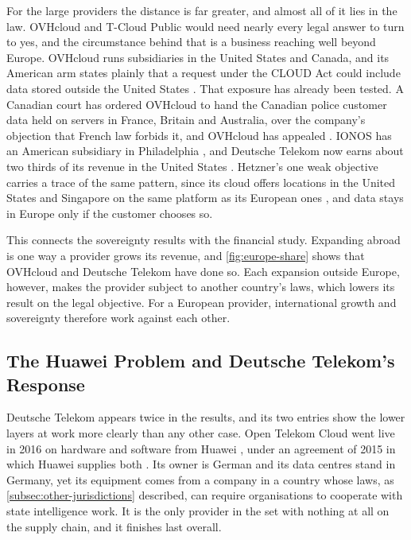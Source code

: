 For the large providers the distance is far greater, and almost all of it lies in
the law. OVHcloud and T-Cloud Public would need nearly every legal answer to turn
to yes, and the circumstance behind that is a business reaching well beyond
Europe. OVHcloud runs subsidiaries in the United States and Canada, and its
American arm states plainly that a request under the \acs{CLOUD Act} could include
data stored outside the United States \cite{OVHUS_CloudAct}. That exposure has
already been tested. A Canadian court has ordered OVHcloud to hand the Canadian
police customer data held on servers in France, Britain and Australia, over the
company's objection that French law forbids it, and OVHcloud has appealed
\cite{Heise_OVHCanada_2025}. IONOS has an American subsidiary in Philadelphia
\cite{UnitedInternet_AR_2025}, and Deutsche Telekom now earns about two thirds of
its revenue in the United States \cite{DT_AR_2025}. Hetzner's one weak objective
carries a trace of the same pattern, since its cloud offers locations in the
United States and Singapore on the same platform as its European ones
\cite{Hetzner_Locations}, and data stays in Europe only if the customer chooses
so.

This connects the sovereignty results with the financial study. Expanding abroad
is one way a provider grows its revenue, and \cref{fig:europe-share} shows that
OVHcloud and Deutsche Telekom have done so. Each expansion outside Europe,
however, makes the provider subject to another country's laws, which lowers its
result on the legal objective. For a European provider, international growth and
sovereignty therefore work against each other.

\subsection{The Huawei Problem and Deutsche Telekom's Response}
\label{subsec:huawei}

Deutsche Telekom appears twice in the results, and its two entries show the lower
layers at work more clearly than any other case. Open Telekom Cloud went live in
2016 on hardware and software from Huawei \cite{OTC_GoesLive_2016}, under an
agreement of 2015 in which Huawei supplies both \cite{LightReading_DT_2025}. Its
owner is German and its data centres stand in Germany, yet its equipment comes
from a company in a country whose laws, as \cref{subsec:other-jurisdictions}
described, can require organisations to cooperate with state intelligence work.
It is the only provider in the set with nothing at all on the supply chain, and it
finishes last overall.

